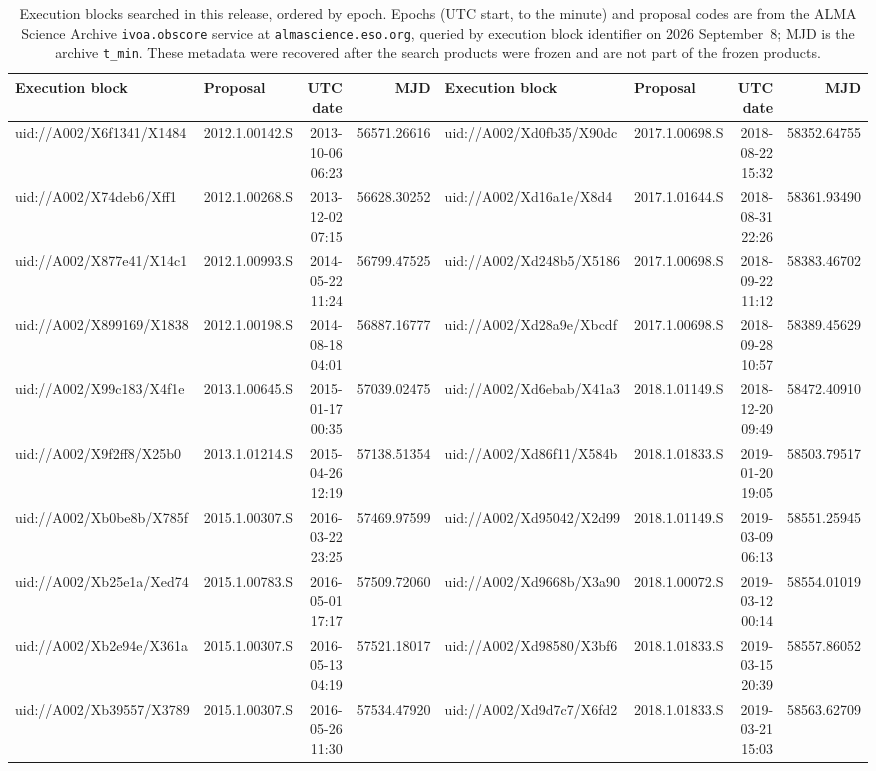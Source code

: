 \documentclass{openjournal}
\begin{document}
\begin{table}
\centering
\tiny
\setlength{\tabcolsep}{2pt}
\caption{Execution blocks searched in this release, ordered by epoch.
Epochs (UTC start, to the minute) and proposal codes are from the ALMA
Science Archive \texttt{ivoa.obscore} service at
\texttt{almascience.eso.org}, queried by execution block identifier on
2026 September~8; MJD is the archive \texttt{t\_min}. These metadata
were recovered after the search products were frozen and are not part
of the frozen
products.}
\label{tab:ebs}
\begin{tabular}{@{}l l r r@{\hspace{18pt}}l l r r@{}}
\hline
Execution block & Proposal & UTC date & MJD &
Execution block & Proposal & UTC date & MJD \\
\hline
uid://A002/X6f1341/X1484 & 2012.1.00142.S & 2013-10-06 06:23 & 56571.26616 & uid://A002/Xd0fb35/X90dc & 2017.1.00698.S & 2018-08-22 15:32 & 58352.64755 \\
uid://A002/X74deb6/Xff1 & 2012.1.00268.S & 2013-12-02 07:15 & 56628.30252 & uid://A002/Xd16a1e/X8d4 & 2017.1.01644.S & 2018-08-31 22:26 & 58361.93490 \\
uid://A002/X877e41/X14c1 & 2012.1.00993.S & 2014-05-22 11:24 & 56799.47525 & uid://A002/Xd248b5/X5186 & 2017.1.00698.S & 2018-09-22 11:12 & 58383.46702 \\
uid://A002/X899169/X1838 & 2012.1.00198.S & 2014-08-18 04:01 & 56887.16777 & uid://A002/Xd28a9e/Xbcdf & 2017.1.00698.S & 2018-09-28 10:57 & 58389.45629 \\
uid://A002/X99c183/X4f1e & 2013.1.00645.S & 2015-01-17 00:35 & 57039.02475 & uid://A002/Xd6ebab/X41a3 & 2018.1.01149.S & 2018-12-20 09:49 & 58472.40910 \\
uid://A002/X9f2ff8/X25b0 & 2013.1.01214.S & 2015-04-26 12:19 & 57138.51354 & uid://A002/Xd86f11/X584b & 2018.1.01833.S & 2019-01-20 19:05 & 58503.79517 \\
uid://A002/Xb0be8b/X785f & 2015.1.00307.S & 2016-03-22 23:25 & 57469.97599 & uid://A002/Xd95042/X2d99 & 2018.1.01149.S & 2019-03-09 06:13 & 58551.25945 \\
uid://A002/Xb25e1a/Xed74 & 2015.1.00783.S & 2016-05-01 17:17 & 57509.72060 & uid://A002/Xd9668b/X3a90 & 2018.1.00072.S & 2019-03-12 00:14 & 58554.01019 \\
uid://A002/Xb2e94e/X361a & 2015.1.00307.S & 2016-05-13 04:19 & 57521.18017 & uid://A002/Xd98580/X3bf6 & 2018.1.01833.S & 2019-03-15 20:39 & 58557.86052 \\
uid://A002/Xb39557/X3789 & 2015.1.00307.S & 2016-05-26 11:30 & 57534.47920 & uid://A002/Xd9d7c7/X6fd2 & 2018.1.01833.S & 2019-03-21 15:03 & 58563.62709 \\

\end{tabular}
\end{table}
\end{document}
